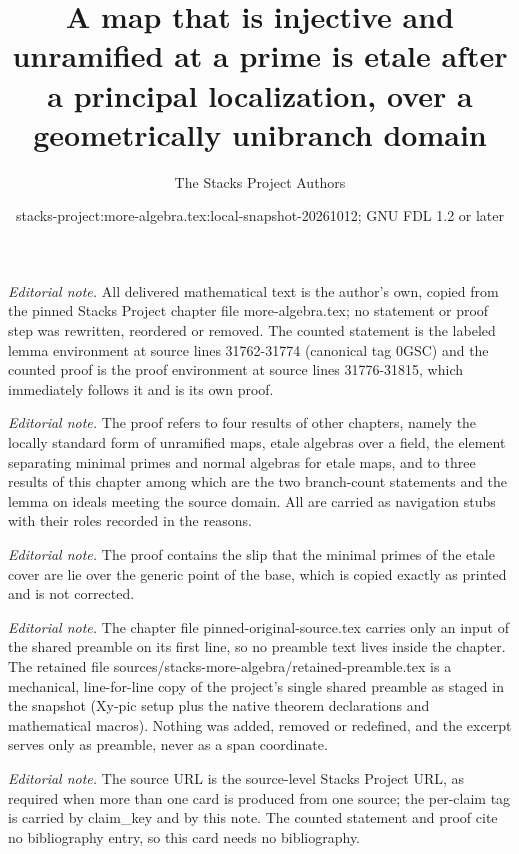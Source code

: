 \documentclass[10pt,a4paper]{amsart}
\title{A map that is injective and unramified at a prime is etale after a principal localization, over a geometrically unibranch domain}
\author{The Stacks Project Authors}
\date{stacks-project:more-algebra.tex:local-snapshot-20261012; GNU FDL 1.2 or later}
\theoremstyle{plain}
\theoremstyle{definition}
\theoremstyle{remark}
\numberwithin{equation}{subsection}
\begin{document}
\maketitle
\setcounter{subsection}{1}
\noindent\textit{Editorial note.} All delivered mathematical text is the author's own, copied from the pinned Stacks Project chapter file more-algebra.tex; no statement or proof step was rewritten, reordered or removed. The counted statement is the labeled lemma environment at source lines 31762-31774 (canonical tag 0GSC) and the counted proof is the proof environment at source lines 31776-31815, which immediately follows it and is its own proof.\par\medskip
\noindent\textit{Editorial note.} The proof refers to four results of other chapters, namely the locally standard form of unramified maps, etale algebras over a field, the element separating minimal primes and normal algebras for etale maps, and to three results of this chapter among which are the two branch-count statements and the lemma on ideals meeting the source domain. All are carried as navigation stubs with their roles recorded in the reasons.\par\medskip
\noindent\textit{Editorial note.} The proof contains the slip that the minimal primes of the etale cover are lie over the generic point of the base, which is copied exactly as printed and is not corrected.\par\medskip
\noindent\textit{Editorial note.} The chapter file pinned-original-source.tex carries only an input of the shared preamble on its first line, so no preamble text lives inside the chapter. The retained file sources/stacks-more-algebra/retained-preamble.tex is a mechanical, line-for-line copy of the project's single shared preamble as staged in the snapshot (Xy-pic setup plus the native theorem declarations and mathematical macros). Nothing was added, removed or redefined, and the excerpt serves only as preamble, never as a span coordinate.\par\medskip
\noindent\textit{Editorial note.} The source URL is the source-level Stacks Project URL, as required when more than one card is produced from one source; the per-claim tag is carried by claim\_key and by this note. The counted statement and proof cite no bibliography entry, so this card needs no bibliography.\par\medskip
\end{document}
